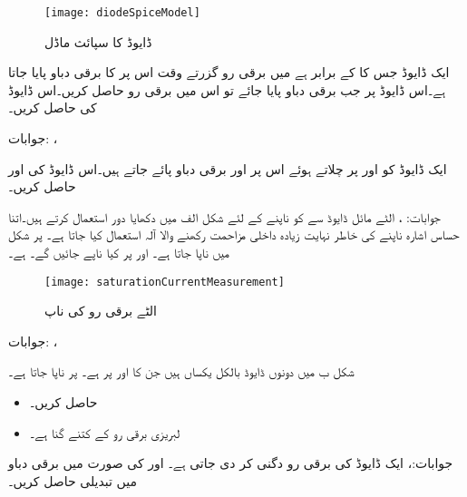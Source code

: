 \begin{figure}
\centering
\texttt{[image: diodeSpiceModel]}
\caption{ڈایوڈ کا سپائث ماڈل}
\label{شکل_ڈایوڈ_کا_سپائث_ماڈل}
\end{figure}
\newpage
{}
ایک ڈایوڈ جس کا  کے برابر ہے میں  برقی رو گزرتے وقت اس پر  کا برقی دباو پایا جاتا ہے۔اس ڈایوڈ پر جب  برقی دباو پایا جائے تو اس میں برقی رو حاصل کریں۔اس ڈایوڈ کی  حاصل کریں۔

جوابات: ،   

ایک ڈایوڈ کو  اور  پر چلاتے ہوئے اس پر  اور  برقی دباو پائے جاتے ہیں۔اس ڈایوڈ کی  اور  حاصل کریں۔

جوابات: ، 
الٹے مائل ڈایوڈ سے  کو ناپنے کے لئے شکل  الف میں دکھایا دور استعمال کرتے ہیں۔اتنا حساس اشارہ ناپنے کی خاطر نہایت زیادہ داخلی مزاحمت رکھنے والا آلہ استعمال کیا جاتا ہے۔ پر شکل میں  ناپا جاتا ہے۔ اور  پر کیا ناپے جائیں گے۔ ہے۔
\begin{figure}
\centering
\texttt{[image: saturationCurrentMeasurement]}
\caption{الٹے برقی رو کی ناپ}
\label{شکل_سوال_الٹے_برقی_رو_ناپ}
\end{figure}

جوابات: ، 

شکل   ب میں دونوں ڈایوڈ بالکل یکساں ہیں جن کا  اور   پر  ہے۔ پر  ناپا جاتا ہے۔
\begin{itemize}
\item
{} حاصل کریں۔
\item
{} لبریزی برقی رو  کے کتنے گنا ہے۔
\end{itemize}
جوابات:، 
ایک ڈایوڈ کی برقی رو دگنی کر دی جاتی ہے۔ اور  کی صورت میں برقی دباو میں تبدیلی حاصل کریں۔


